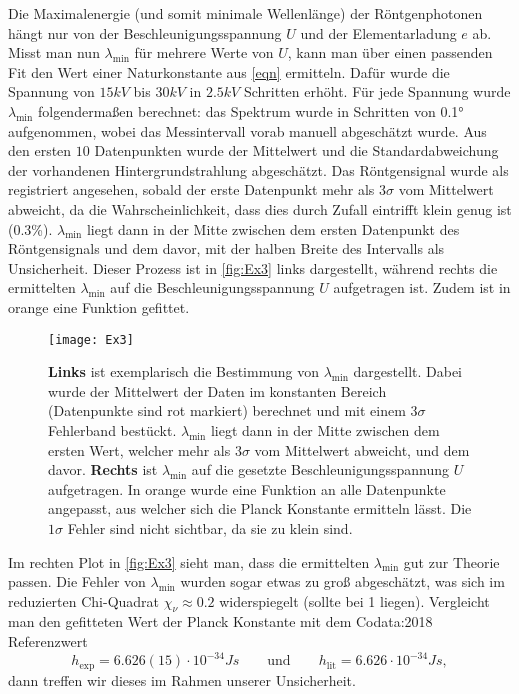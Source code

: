 Die Maximalenergie (und somit minimale Wellenlänge) der Röntgenphotonen hängt nur von der Beschleunigungsspannung \( U \) und der Elementarladung \( e \) ab. Misst man nun \( \lambda_{\mathrm{min}} \) für mehrere Werte von \( U \), kann man über einen passenden Fit den Wert einer Naturkonstante aus \autoref{eqn} ermitteln. Dafür wurde die Spannung von \( 15 \unit{kV} \) bis \( 30 \unit{kV} \) in \( 2.5 \unit{kV} \) Schritten erhöht. Für jede Spannung wurde \( \lambda_{\mathrm{min}} \) folgendermaßen berechnet: das Spektrum wurde in Schritten von \ang{0.1} aufgenommen, wobei das Messintervall vorab manuell abgeschätzt wurde. Aus den ersten \( 10 \) Datenpunkten wurde der Mittelwert und die Standardabweichung der vorhandenen Hintergrundstrahlung abgeschätzt. Das Röntgensignal wurde als registriert angesehen, sobald der erste Datenpunkt mehr als \( 3\sigma \) vom Mittelwert abweicht, da die Wahrscheinlichkeit, dass dies durch Zufall eintrifft klein genug ist (0.3\%). \( \lambda_{\mathrm{min}} \) liegt dann in der Mitte zwischen dem ersten Datenpunkt des Röntgensignals und dem davor, mit der halben Breite des Intervalls als Unsicherheit. Dieser Prozess ist in \autoref{fig:Ex3} links dargestellt, während rechts die ermittelten \( \lambda_{\mathrm{min}} \) auf die Beschleunigungsspannung \( U \) aufgetragen ist. Zudem ist in orange eine Funktion gefittet.

\begin{figure}[H]
	\centering
	\texttt{[image: Ex3]}
	\caption{\textbf{Links} ist exemplarisch die Bestimmung von \( \lambda_{\text{min}} \) dargestellt. Dabei wurde der Mittelwert der Daten im konstanten Bereich (Datenpunkte sind rot markiert) berechnet und mit einem \( 3\sigma \) Fehlerband bestückt. \( \lambda_{\text{min}} \) liegt dann in der Mitte zwischen dem ersten Wert, welcher mehr als \( 3\sigma \) vom Mittelwert abweicht, und dem davor. \textbf{Rechts} ist \( \lambda_{\text{min}} \) auf die gesetzte Beschleunigungsspannung \( U \) aufgetragen. In orange wurde eine Funktion an alle Datenpunkte angepasst, aus welcher sich die Planck Konstante ermitteln lässt. Die \( 1\sigma \) Fehler sind nicht sichtbar, da sie zu klein sind.}
	\label{fig:Ex3}
\end{figure}

Im rechten Plot in \autoref{fig:Ex3} sieht man, dass die ermittelten \( \lambda_{\mathrm{min}} \) gut zur Theorie passen. Die Fehler von \( \lambda_{\mathrm{min}} \) wurden sogar etwas zu groß abgeschätzt, was sich im reduzierten Chi-Quadrat \( \chi_\nu \approx 0.2 \) widerspiegelt (sollte bei 1 liegen). Vergleicht man den gefitteten Wert der Planck Konstante mit dem Codata:2018 Referenzwert \autocite{codata}
\begin{equation*}
	h_{\text{exp}} = 6.626(15) \cdot 10^{-34} \unit{Js} \qquad\text{und}\qquad h_{\text{lit}} = 6.626 \cdot 10^{-34} \unit{Js},
\end{equation*}
dann treffen wir dieses im Rahmen unserer Unsicherheit.

